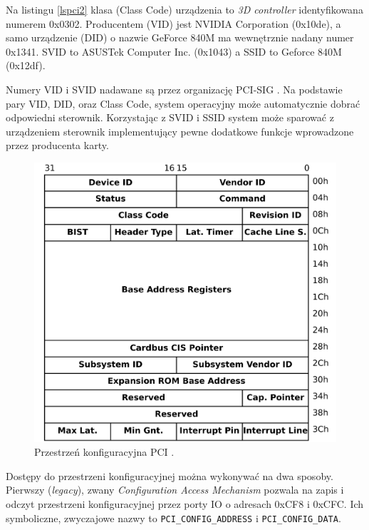 \documentclass[shortabstract,inz]{iithesis}
\begin{document}
Na listingu \ref{lspci2} klasa (Class Code) urządzenia to \textit{3D controller} identyfikowana numerem
0x0302.
Producentem (VID) jest NVIDIA Corporation (0x10de), a samo urządzenie (DID) o nazwie GeForce 840M 
ma wewnętrznie nadany numer 0x1341.
SVID to ASUSTek Computer Inc. (0x1043) a SSID to Geforce 840M (0x12df).

Numery VID i SVID nadawane są przez organizację PCI-SIG \cite{pcisig}.
Na podstawie pary VID, DID, oraz Class Code, system operacyjny może automatycznie
dobrać odpowiedni sterownik. Korzystając z SVID i SSID system może sparować z urządzeniem
sterownik implementujący pewne dodatkowe funkcje wprowadzone przez producenta karty.

\begin{figure}
  \begin{center}
    \includegraphics[width=\linewidth]{pci_config_space}
  \caption{Przestrzeń konfiguracyjna PCI \cite{image:pci_config_space}.}
\end{center}
\end{figure}

Dostępy do przestrzeni konfiguracyjnej można wykonywać na dwa sposoby.
Pierwszy (\textit{legacy}), zwany \textit{Configuration Access Mechanism} pozwala na zapis i odczyt 
przestrzeni konfiguracyjnej przez porty IO o adresach 0xCF8 i 0xCFC. 
Ich symboliczne, zwyczajowe nazwy to \texttt{PCI\_CONFIG\_ADDRESS} i \texttt{PCI\_CONFIG\_DATA}.
\end{document}
